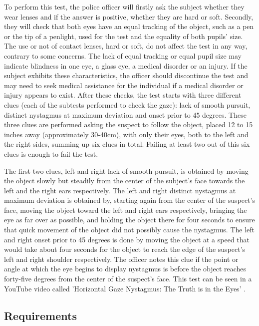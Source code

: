 To perform this test, the police officer will firstly ask the subject whether they wear lenses and if the answer is positive, whether they are hard or soft. Secondly, they will check that both eyes have an equal tracking of the object, such as a pen or the tip of a penlight, used for the test and the equality of both pupils' size. The use or not of contact lenses, hard or soft, do not affect the test in any way, contrary to some concerns. The lack of equal tracking or equal pupil size may indicate blindness in one eye, a glass eye, a medical disorder or an injury. If the subject exhibits these characteristics, the officer should discontinue the test and may need to seek medical assistance for the individual if a medical disorder or injury appears to exist. After these checks, the test starts with three different clues (each of the subtests performed to check the gaze): lack of smooth pursuit, distinct nystagmus at maximum deviation and onset prior to 45 degrees. These three clues are performed asking the suspect to follow the object, placed 12 to 15 inches away (approximately 30-40cm), with only their eyes, both to the left and the right sides, summing up six clues in total. Failing at least two out of this six clues is enough to fail the test.

The first two clues, left and right lack of smooth pursuit, is obtained by moving the object slowly but steadily from the center of the subject's face towards the left and the right ears respectively. The left and right distinct nystagmus at maximum deviation is obtained by, starting again from the center of the suspect's face, moving the object toward the left and right ears respectively, bringing the eye as far over as possible, and holding the object there for four seconds to ensure that quick movement of the object did not possibly cause the nystagmus. The left and right onset prior to 45 degrees is done by moving the object at a speed that would take about four seconds for the object to reach the edge of the suspect's left and right shoulder respectively. The officer notes this clue if the point or angle at which the eye begins to display nystagmus is before the object reaches forty-five degrees from the center of the suspect's face. This test can be seen in a YouTube \cite{YouTube} video called 'Horizontal Gaze Nystagmus: The Truth is in the Eyes' \cite{YouTubeVideo}.

\subsection{Requirements}

